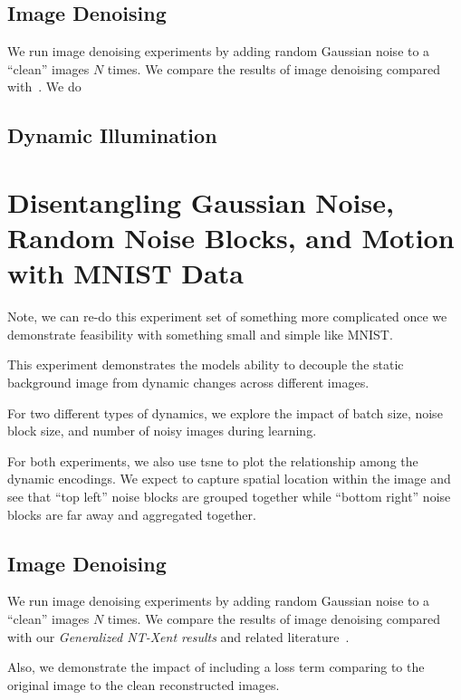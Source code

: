 \documentclass[11pt]{article}
\begin{document}
\subsection{Image Denoising}\label{subsec:disent_mnist_denoising}

We run image denoising experiments by adding random Gaussian noise to a ``clean'' images $N$ times. We compare the results of image denoising compared with~\cite{xia2019training,metzler2016denoising,li2013efficient}. We do 

\subsection{Dynamic Illumination}\label{subsec:disent_mnist_illumination}

\section{Disentangling Gaussian Noise, Random Noise Blocks, and Motion with MNIST Data}\label{sec:disent_mnist}

Note, we can re-do this experiment set of something more complicated once we demonstrate feasibility with something small and simple like MNIST.

This experiment demonstrates the models ability to decouple the static background image from dynamic changes across different images.

For two different types of dynamics, we explore the impact of batch size, noise block size, and number of noisy images during learning.

For both experiments, we also use tsne to plot the relationship among the dynamic encodings. We expect to capture spatial location within the image and see that ``top left'' noise blocks are grouped together while ``bottom right'' noise blocks are far away and aggregated together.


\subsection{Image Denoising}\label{subsec:disent_mnist_denoising}

We run image denoising experiments by adding random Gaussian noise to a ``clean'' images $N$ times. We compare the results of image denoising compared with our \emph{Generalized NT-Xent results} and related literature~\cite{xia2019training,metzler2016denoising,li2013efficient}.

Also, we demonstrate the impact of including a loss term comparing to the original image to the clean reconstructed images.
\end{document}
